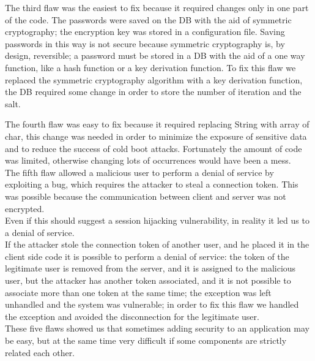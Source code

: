 The third flaw was the easiest to fix because it required changes only in one part of the code.\newline
The passwords were saved on the DB with the aid of symmetric cryptography; the encryption key was stored in a configuration file.\newline
Saving passwords in this way is not secure because symmetric cryptography is, by design, reversible; a password must be stored in a DB with the aid of a one way function, like a hash function or a key derivation function.\newline
To fix this flaw we replaced the symmetric cryptography algorithm with a key derivation function, the DB required some change in order to store the number of iteration and the salt.\newline

The fourth flaw was easy to fix because it required replacing String with array of char, this change was needed in order to minimize the exposure of sensitive data and to reduce the success of cold boot attacks.\newline
Fortunately the amount of code was limited, otherwise changing lots of occurrences would have been a mess.\\

The fifth flaw allowed a malicious user to perform a denial of service by exploiting a bug, which requires the attacker to steal a connection
token. This was possible because the communication between client and server was not encrypted.\\
Even if this should suggest a session hijacking vulnerability, in reality it led us to a denial of service.\\
If the attacker stole the connection token of another user, and he placed it in the client side code it is possible
to perform a denial of service: the token of the legitimate user is removed from the server, and it is assigned to the malicious user, but 
the attacker has another token associated, and it is not possible to associate more than one token at the same time; the exception was left unhandled and the system was vulnerable; in order to fix this flaw we handled the exception and avoided the disconnection for the legitimate user.\\

These five flaws showed us that sometimes adding security to an application may be easy, but at the same time very difficult if some components are strictly related each other.\\

